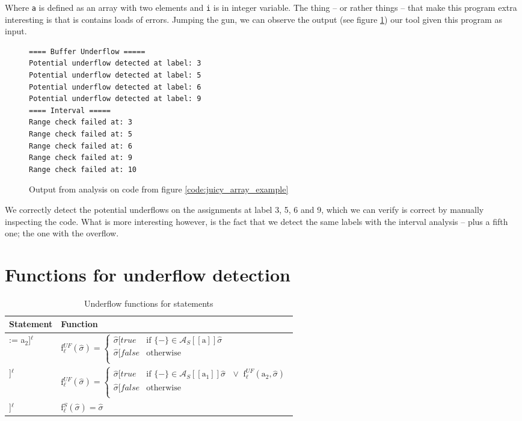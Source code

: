 Where \texttt{a} is defined as an array with two elements and \texttt{i} is in integer variable. The thing -- or rather things -- that make this program extra interesting is that is contains loads of errors. Jumping the gun, we can observe the output (see figure \ref{code:juicy_array_example_output}) our tool given this program as input.
\begin{figure}
  \begin{lstlisting}[numbers=none]
==== Buffer Underflow =====
Potential underflow detected at label: 3
Potential underflow detected at label: 5
Potential underflow detected at label: 6
Potential underflow detected at label: 9
==== Interval =====
Range check failed at: 3
Range check failed at: 5
Range check failed at: 6
Range check failed at: 9
Range check failed at: 10
\end{lstlisting}
\caption{Output from analysis on code from figure \ref{code:juicy_array_example}}
\label{code:juicy_array_example_output}
\end{figure}We correctly detect the potential underflows on the assignments at label 3, 5, 6 and 9, which we can verify is correct by manually inspecting the code. What is more interesting however, is the fact that we detect the same labels with the interval analysis -- plus a fifth one; the one with the overflow.

\section{Functions for underflow detection}
\begin{table}[h]
\begin{tabular}{| l | l |}
  \hline
  Statement & Function \\
  \hline
  \hline
  [A[a$_1$] := a$_2$]$^\ell$ & f$_\ell^{UF} (\widehat{\sigma}) = 
     \begin{cases} 
        \widehat{\sigma}[true   & \text{if } \{-\} \in \mathcal{A}_S [\![\text{a}]\!]\widehat{\sigma}\\
        \widehat{\sigma}[false  & \text{otherwise} \\
     \end{cases}$\\
  \hline
  [read A[a]]$^\ell$ & f$_\ell^{UF} (\widehat{\sigma}) = 
     \begin{cases} 
        \widehat{\sigma}[true   & \text{if } \{-\} \in  \mathcal{A}_S [\![\text{a}_1]\!]\widehat{\sigma}\text{ } \vee \text{ f}_\ell^{UF} (\text{a}_2,\widehat{\sigma}) \\
        \widehat{\sigma}[false  & \text{otherwise} \\
     \end{cases}$\\
  \hline
  [write A[n]]$^\ell$ & f$_\ell^S (\widehat{\sigma}) = \widehat{\sigma}$\\
  \hline
\end{tabular}
\centering
\caption{Underflow functions for statements}
\label{table:underflow_functions_statements}
\end{table}


